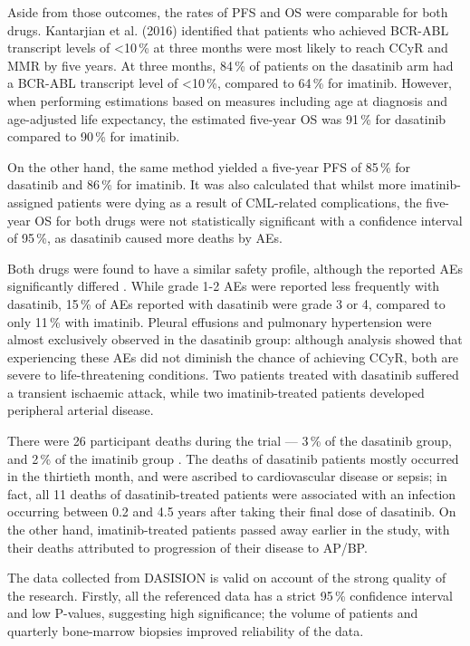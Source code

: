 Aside from those outcomes, the rates of PFS and OS were comparable for both drugs. Kantarjian et al. (2016) identified that patients who achieved BCR-ABL transcript levels of <10\,\% at three months were most likely to reach CCyR and MMR by five years. At three months, 84\,\% of patients on the dasatinib arm had a BCR-ABL transcript level of <10\,\%, compared to 64\,\% for imatinib. However, when performing estimations based on measures including age at diagnosis and age-adjusted life expectancy, the estimated five-year OS was 91\,\% for dasatinib compared to 90\,\% for imatinib.

On the other hand, the same method yielded a five-year PFS of 85\,\% for dasatinib and 86\,\% for imatinib. It was also calculated that whilst more imatinib-assigned patients were dying as a result of CML-related complications, the five-year OS for both drugs were not statistically significant with a confidence interval of 95\,\%, as dasatinib caused more deaths by AEs.

Both drugs were found to have a similar safety profile, although the reported AEs significantly differed \citep{RefWorks:doc:58564bd8e4b0f87b6b283223}. While grade 1-2 AEs were reported less frequently with dasatinib, 15\,\% of AEs reported with dasatinib were grade 3 or 4, compared to only 11\,\% with imatinib. Pleural effusions and pulmonary hypertension were almost exclusively observed in the dasatinib group: although analysis showed that experiencing these AEs did not diminish the chance of achieving CCyR, both are severe to life-threatening conditions. Two patients treated with dasatinib suffered a transient ischaemic attack, while two imatinib-treated patients developed peripheral arterial disease.

There were 26 participant deaths during the trial --- 3\,\% of the dasatinib group, and 2\,\% of the imatinib group \citep{RefWorks:doc:58564bd8e4b0f87b6b283223}. The deaths of dasatinib patients mostly occurred in the thirtieth month, and were ascribed to cardiovascular disease or sepsis; in fact, all 11 deaths of dasatinib-treated patients were associated with an infection occurring between 0.2 and 4.5 years after taking their final dose of dasatinib. On the other hand, imatinib-treated patients passed away earlier in the study, with their deaths attributed to progression of their disease to AP/BP.

The data collected from DASISION is valid on account of the strong quality of the research. Firstly, all the referenced data has a strict 95\,\% confidence interval and low P-values, suggesting high significance; the volume of patients and quarterly bone-marrow biopsies improved reliability of the data.


